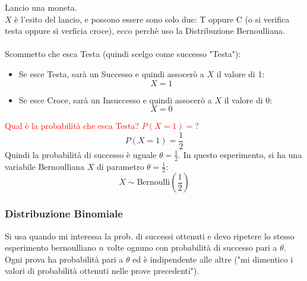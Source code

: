 \documentclass{article}  %
\theoremstyle{definition}
\begin{document}
\begin{esercizio}[Esempio]
	Lancio una moneta. \\
	$X$ è l'esito del lancio, e possono essere sono solo due: T oppure C (o si verifica testa oppure si verficia croce), ecco perchè uso la Distribuzione Bernoulliana. \\ \\
	Scommetto che esca Testa (quindi scelgo come successo "Testa"):
	\begin{itemize}
		\item Se esce Testa, sarà un Successo e quindi assocerò a $X$ il valore di 1:
		      \[
			      X=1
		      \]
		\item Se esce Croce, sarà un Insuccesso e quindi assocerò a $X$ il valore di 0:
		      \[
			      X=0
		      \]
	\end{itemize}
	\textcolor{red}{Qual è la probabilità che esca Testa? $P(X=1)=?$}
	\[
		P(X=1)=\frac{1}{2}
	\]
	Quindi la probabilità di successo è uguale $\theta=\frac{1}{2}$.
	In questo esperimento, si ha una variabile Bernoulliana $X$ di parametro $\theta=\frac{1}{2}$:
	\[
		X \sim \text{Bernoulli}\left(\frac{1}{2}\right)
	\]
\end{esercizio}

\subsubsection{Distribuzione Binomiale}
Si usa quando mi interessa la prob. di successi ottenuti e devo ripetere lo stesso esperimento bernoulliano $n$ volte ognuno con probabilità di successo pari a $\theta$.\\
Ogni prova ha probabilità pari a $\theta$ ed è indipendente alle altre ("mi dimentico i valori di probabilità ottenuti nelle prove precedenti").
\end{document}
